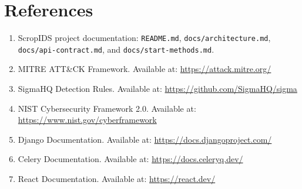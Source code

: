 \documentclass[12pt,a4paper]{report}
\begin{document}
\chapter*{References}
\begin{enumerate}
    \item ScropIDS project documentation: \texttt{README.md}, \texttt{docs/architecture.md}, \texttt{docs/api-contract.md}, and \texttt{docs/start-methods.md}.
    \item MITRE ATT\&CK Framework. Available at: \url{https://attack.mitre.org/}
    \item SigmaHQ Detection Rules. Available at: \url{https://github.com/SigmaHQ/sigma}
    \item NIST Cybersecurity Framework 2.0. Available at: \url{https://www.nist.gov/cyberframework}
    \item Django Documentation. Available at: \url{https://docs.djangoproject.com/}
    \item Celery Documentation. Available at: \url{https://docs.celeryq.dev/}
    \item React Documentation. Available at: \url{https://react.dev/}
\end{enumerate}
\end{document}
